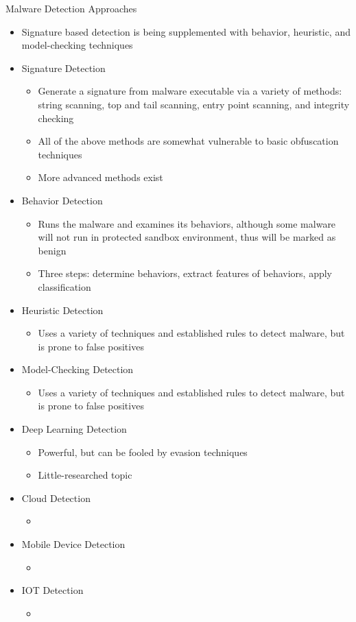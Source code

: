 \documentclass{article}
\begin{document}
Malware Detection Approaches
\begin{itemize}
\item Signature based detection is being supplemented with behavior, heuristic, and model-checking techniques
\item Signature Detection
	\begin{itemize}
	\item Generate a signature from malware executable via a variety of methods: string scanning, top and tail scanning, entry point scanning, and integrity checking
	\item All of the above methods are somewhat vulnerable to basic obfuscation techniques
	\item More advanced methods exist
	\end{itemize}
\item Behavior Detection
	\begin{itemize}
	\item Runs the malware and examines its behaviors, although some malware will not run in protected sandbox environment, thus will be marked as benign
	\item Three steps: determine behaviors, extract features of behaviors, apply classification
	\end{itemize}
\item Heuristic Detection
	\begin{itemize}
	\item Uses a variety of techniques and established rules to detect malware, but is prone to false positives
	\end{itemize}
\item Model-Checking Detection
	\begin{itemize}
	\item Uses a variety of techniques and established rules to detect malware, but is prone to false positives
	\end{itemize}
\item Deep Learning Detection
	\begin{itemize}
	\item Powerful, but can be fooled by evasion techniques
	\item Little-researched topic
	\end{itemize}
\item Cloud Detection
	\begin{itemize}
	\item 
	\end{itemize}
\item Mobile Device Detection
	\begin{itemize}
	\item 
	\end{itemize}
\item IOT Detection
	\begin{itemize}
	\item 
	\end{itemize}
\end{itemize}
\end{document}
